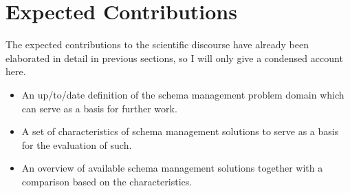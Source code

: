 
\section{Expected Contributions}\label{sec:expected-results}

The expected contributions to the scientific discourse have already been elaborated in detail in previous sections, so I will only give a condensed account here.

\begin{itemize}
  \item An up\-/to\-/date definition of the schema management problem domain which can serve as a basis for further work.
  \item A set of characteristics of schema management solutions to serve as a basis for the evaluation of such.
  \item An overview of available schema management solutions together with a comparison based on the characteristics.
\end{itemize}

